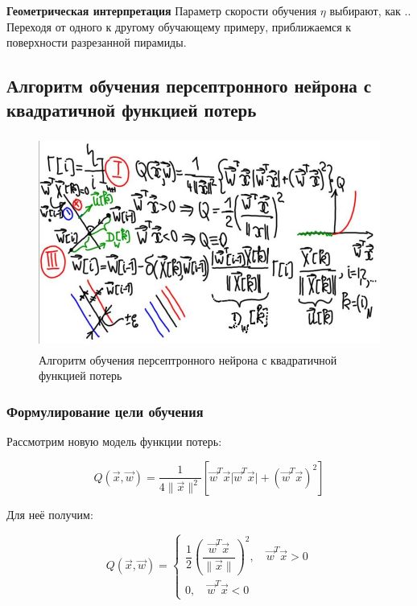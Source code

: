 \documentclass[a4paper]{article}
\numberwithin{equation}{subsection}
\begin{document}
\textbf{Геометрическая интерпретация}
Параметр скорости обучения $\eta$ выбирают, как .. 
Переходя от одного к другому обучающему примеру, приближаемся к поверхности разрезанной 
пирамиды.

\subsection{Алгоритм обучения персептронного нейрона с квадратичной функцией потерь}

\begin{figure}[htbp]
    \centering
    \includegraphics[height=7cm]{hyperflat_8_1.jpeg}
    \caption{Алгоритм обучения персептронного нейрона с квадратичной функцией потерь}
    \label{hyperflat_8_1}
\end{figure}





\subsubsection{Формулирование цели обучения}

Рассмотрим новую модель функции потерь:

\begin{equation}
    Q\left( \vec{x}, \vec{w} \right) = \dfrac{1}{4 \| \vec{x} \| ^2 } 
    \left[
        \vec{w}^T \vec{x} \lvert \vec{w}^T \vec{x} \rvert +
        \left( \vec{w}^T \vec{x} \right)^2
    \right]
\end{equation}

Для неё получим:

\begin{equation}
    Q\left( \vec{x}, \vec{w} \right) =
    \begin{cases}
        \dfrac{1}{2} \left( \dfrac{\vec{w}^T \vec{x}}{\| \vec{x} \|} \right) ^2, 
        \quad \vec{w}^T \vec{x} > 0\\
        0, \quad \vec{w}^T \vec{x} < 0
    \end{cases}
\end{equation}
\end{document}
